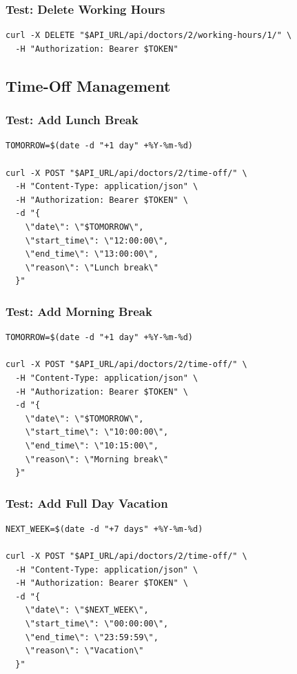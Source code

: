 \documentclass[12pt,a4paper]{article}
\begin{document}
\subsubsection{Test: Delete Working Hours}
\begin{lstlisting}[style=bash]
curl -X DELETE "$API_URL/api/doctors/2/working-hours/1/" \
  -H "Authorization: Bearer $TOKEN"
\end{lstlisting}

\subsection{Time-Off Management}

\subsubsection{Test: Add Lunch Break}
\begin{lstlisting}[style=bash]
TOMORROW=$(date -d "+1 day" +%Y-%m-%d)

curl -X POST "$API_URL/api/doctors/2/time-off/" \
  -H "Content-Type: application/json" \
  -H "Authorization: Bearer $TOKEN" \
  -d "{
    \"date\": \"$TOMORROW\",
    \"start_time\": \"12:00:00\",
    \"end_time\": \"13:00:00\",
    \"reason\": \"Lunch break\"
  }"
\end{lstlisting}

\subsubsection{Test: Add Morning Break}
\begin{lstlisting}[style=bash]
TOMORROW=$(date -d "+1 day" +%Y-%m-%d)

curl -X POST "$API_URL/api/doctors/2/time-off/" \
  -H "Content-Type: application/json" \
  -H "Authorization: Bearer $TOKEN" \
  -d "{
    \"date\": \"$TOMORROW\",
    \"start_time\": \"10:00:00\",
    \"end_time\": \"10:15:00\",
    \"reason\": \"Morning break\"
  }"
\end{lstlisting}

\subsubsection{Test: Add Full Day Vacation}
\begin{lstlisting}[style=bash]
NEXT_WEEK=$(date -d "+7 days" +%Y-%m-%d)

curl -X POST "$API_URL/api/doctors/2/time-off/" \
  -H "Content-Type: application/json" \
  -H "Authorization: Bearer $TOKEN" \
  -d "{
    \"date\": \"$NEXT_WEEK\",
    \"start_time\": \"00:00:00\",
    \"end_time\": \"23:59:59\",
    \"reason\": \"Vacation\"
  }"
\end{lstlisting}
\end{document}
